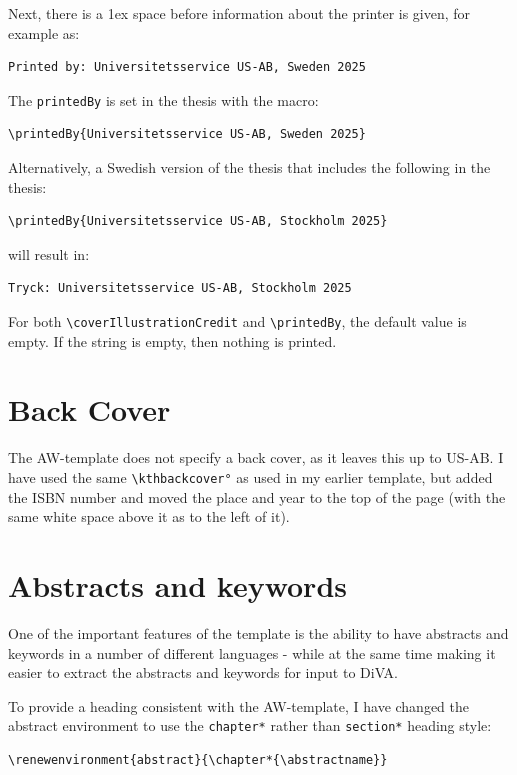 \documentclass[12pt, twoside]{article}
\begin{document}
Next, there is a 1ex space before information about the printer is given, for example as:
\begin{verbatim}
Printed by: Universitetsservice US-AB, Sweden 2025
\end{verbatim}
The \texttt{printedBy} is set in the thesis with the macro:
\begin{lstlisting}[style=latexExampleForAuthors]
\printedBy{Universitetsservice US-AB, Sweden 2025}
\end{lstlisting}
Alternatively, a Swedish version of the thesis 
that includes the following in the thesis:
\begin{lstlisting}[style=latexExampleForAuthors]
\printedBy{Universitetsservice US-AB, Stockholm 2025}
\end{lstlisting}
will result in:
\begin{verbatim}
Tryck: Universitetsservice US-AB, Stockholm 2025
\end{verbatim}

For both \texttt{\textbackslash coverIllustrationCredit} and \texttt{\textbackslash printedBy}, the default value is empty. If the string is empty, then nothing is printed.

\section{Back Cover}
\label{sec:cycle3Backcover}

The AW-template does not specify a back cover, as it leaves this up to US-AB. I have used the same \texttt{\textbackslash kthbackcover°} as used in my earlier template, but \first added the ISBN number and \Second moved the place and year to the top of the page (with the same white space above it as to the left of it).

\section{Abstracts and keywords}
\label{sec:cycle3AbstractsAndKeywords}

One of the important features of the template is the ability to have abstracts and keywords in a number of different languages - while at the same time making it easier to extract the abstracts and keywords for input to DiVA.

To provide a heading consistent with the AW-template, I have changed the abstract environment to use the \texttt{chapter*} rather than \texttt{section*} heading style:
\begin{lstlisting}[style=latexExampleForAuthors]
\renewenvironment{abstract}{\chapter*{\abstractname}}
\end{lstlisting}
\end{document}
